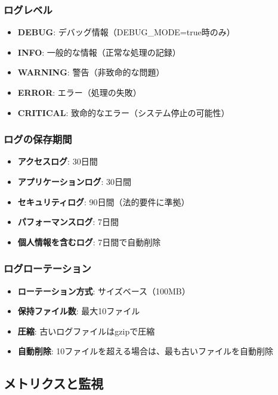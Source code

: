 \documentclass[a4paper,11pt,ja=standard,xelatex]{bxjsarticle}
\theoremstyle{definition}
\begin{document}
\subsubsection{ログレベル}

\begin{itemize}
\item \textbf{DEBUG}: デバッグ情報（DEBUG\_MODE=true時のみ）
\item \textbf{INFO}: 一般的な情報（正常な処理の記録）
\item \textbf{WARNING}: 警告（非致命的な問題）
\item \textbf{ERROR}: エラー（処理の失敗）
\item \textbf{CRITICAL}: 致命的なエラー（システム停止の可能性）
\end{itemize}

\subsubsection{ログの保存期間}

\begin{itemize}
\item \textbf{アクセスログ}: 30日間
\item \textbf{アプリケーションログ}: 30日間
\item \textbf{セキュリティログ}: 90日間（法的要件に準拠）
\item \textbf{パフォーマンスログ}: 7日間
\item \textbf{個人情報を含むログ}: 7日間で自動削除
\end{itemize}

\subsubsection{ログローテーション}

\begin{itemize}
\item \textbf{ローテーション方式}: サイズベース（100MB）
\item \textbf{保持ファイル数}: 最大10ファイル
\item \textbf{圧縮}: 古いログファイルはgzipで圧縮
\item \textbf{自動削除}: 10ファイルを超える場合は、最も古いファイルを自動削除
\end{itemize}

\subsection{メトリクスと監視}
\end{document}
